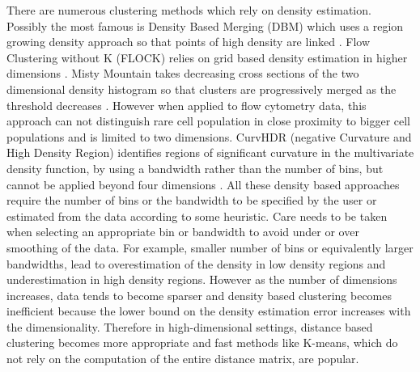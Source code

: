 There are numerous clustering methods which rely on density estimation.
Possibly the most famous is Density Based Merging (DBM) which uses a region growing density approach so that points of high density are linked \citep{Walther:2009gn}.
Flow Clustering without K (FLOCK) relies on grid based density estimation in higher dimensions \citep{Qian:2010ep}.
Misty Mountain takes decreasing cross sections of the two dimensional density histogram so that clusters are progressively merged as the threshold decreases \citep{Sugar:2010jf}.
However when applied to flow cytometry data, this approach can not distinguish rare cell population in close proximity to bigger cell populations and is limited to two dimensions.
CurvHDR (negative Curvature and High Density Region) identifies regions of significant curvature in the multivariate density function,
by using a bandwidth rather than the number of bins, but cannot be applied beyond four dimensions \citep{Naumann:2010fp}.
All these density based approaches require the number of bins or the bandwidth to be specified by the user or estimated from the data according to some heuristic.
Care needs to be taken when selecting an appropriate bin or bandwidth to avoid under or over smoothing of the data.
For example, smaller number of bins or equivalently larger bandwidths, lead to overestimation of the density in low density regions and underestimation in high density regions.
However as the number of dimensions increases, data tends to become sparser
and density based clustering becomes inefficient because the lower bound on the density estimation error increases with the dimensionality.
Therefore in high-dimensional settings, distance based clustering becomes more appropriate and
fast methods like K-means, which do not rely on the computation of the entire distance matrix, are popular.
